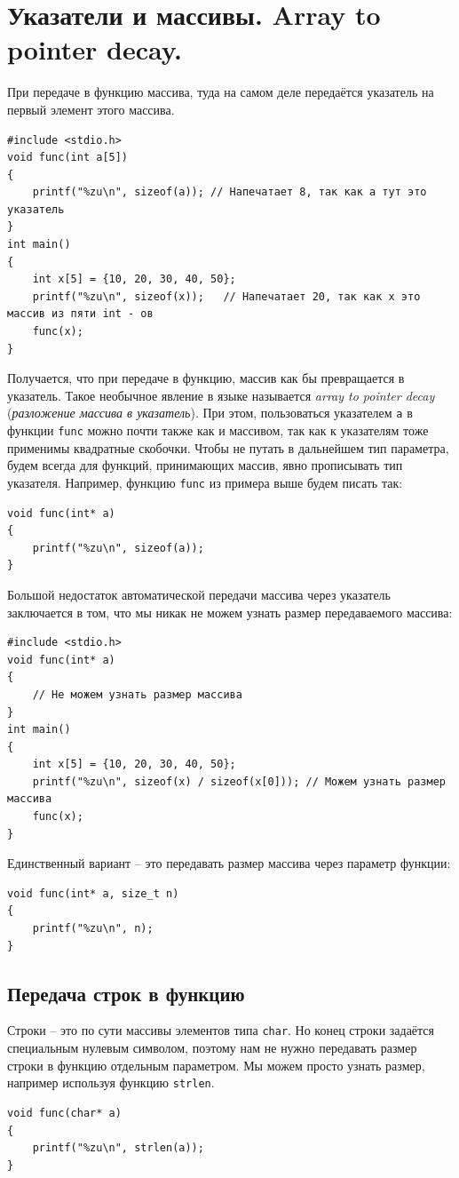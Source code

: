 \documentclass{article}
\begin{document}
\newpage
\section*{Указатели и массивы. Array to pointer decay.}
При передаче в функцию массива, туда на самом деле передаётся указатель на первый элемент этого массива.
\begin{lstlisting}
#include <stdio.h>
void func(int a[5]) 
{
    printf("%zu\n", sizeof(a)); // Напечатает 8, так как a тут это указатель
}
int main() 
{
    int x[5] = {10, 20, 30, 40, 50};
    printf("%zu\n", sizeof(x));   // Напечатает 20, так как x это массив из пяти int - ов
    func(x);
}
\end{lstlisting}

Получается, что при передаче в функцию, массив как бы превращается в указатель. Такое необычное явление в языке называется \textit{array to pointer decay} (\textit{разложение массива в указатель}).
При этом, пользоваться указателем \texttt{a} в функции \texttt{func} можно почти также как и массивом, так как к указателям тоже применимы квадратные скобочки.
Чтобы не путать в дальнейшем тип параметра, будем всегда для функций, принимающих массив, явно прописывать тип указателя. Например, функцию \texttt{func} из примера выше будем писать так:
\begin{lstlisting}
void func(int* a) 
{
    printf("%zu\n", sizeof(a));
}
\end{lstlisting}

Большой недостаток автоматической передачи массива через указатель заключается в том, что мы никак не можем узнать размер передаваемого массива:

\begin{lstlisting}
#include <stdio.h>
void func(int* a) 
{
    // Не можем узнать размер массива
}
int main() 
{
    int x[5] = {10, 20, 30, 40, 50};
    printf("%zu\n", sizeof(x) / sizeof(x[0])); // Можем узнать размер массива
    func(x);
}
\end{lstlisting}

Единственный вариант -- это передавать размер массива через параметр функции:
\begin{lstlisting}
void func(int* a, size_t n) 
{
    printf("%zu\n", n);
}
\end{lstlisting}

\subsection*{Передача строк в функцию}
Строки -- это по сути массивы элементов типа \texttt{char}. Но конец строки задаётся специальным нулевым символом, поэтому нам не нужно передавать размер строки в функцию отдельным параметром. Мы можем просто узнать размер, например используя функцию \texttt{strlen}.
\begin{lstlisting}
void func(char* a) 
{
    printf("%zu\n", strlen(a));
}
\end{lstlisting}
\end{document}
